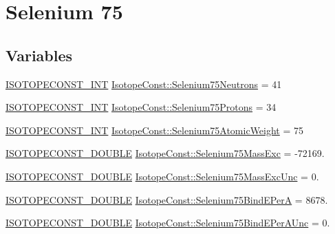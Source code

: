 \hypertarget{group___isotope_const-_selenium-_se75}{}\section{Selenium 75}
\label{group___isotope_const-_selenium-_se75}
\subsection*{Variables}
\begin{DoxyCompactItemize}
\item 
\mbox{\hyperlink{group___isotope_const-_macros_ga5f18360b3e99483a35c32d789e62621c}{I\+S\+O\+T\+O\+P\+E\+C\+O\+N\+S\+T\+\_\+\+I\+NT}} \mbox{\hyperlink{group___isotope_const-_selenium-_se75_gabc52ddd7e44299454b0eb4acbf9bd39d}{Isotope\+Const\+::\+Selenium75\+Neutrons}} = 41
\item 
\mbox{\hyperlink{group___isotope_const-_macros_ga5f18360b3e99483a35c32d789e62621c}{I\+S\+O\+T\+O\+P\+E\+C\+O\+N\+S\+T\+\_\+\+I\+NT}} \mbox{\hyperlink{group___isotope_const-_selenium-_se75_ga55e623409d807066b64cc396ce751565}{Isotope\+Const\+::\+Selenium75\+Protons}} = 34
\item 
\mbox{\hyperlink{group___isotope_const-_macros_ga5f18360b3e99483a35c32d789e62621c}{I\+S\+O\+T\+O\+P\+E\+C\+O\+N\+S\+T\+\_\+\+I\+NT}} \mbox{\hyperlink{group___isotope_const-_selenium-_se75_ga4b5f6c17071e4bca7ecf59ed4d6e69d7}{Isotope\+Const\+::\+Selenium75\+Atomic\+Weight}} = 75
\item 
\mbox{\hyperlink{group___isotope_const-_macros_ga8f45a7272ce02c0b4c65c44636ed719a}{I\+S\+O\+T\+O\+P\+E\+C\+O\+N\+S\+T\+\_\+\+D\+O\+U\+B\+LE}} \mbox{\hyperlink{group___isotope_const-_selenium-_se75_gaa159d6e68e0fd989f88696687c50a6dd}{Isotope\+Const\+::\+Selenium75\+Mass\+Exc}} = -\/72169.
\item 
\mbox{\hyperlink{group___isotope_const-_macros_ga8f45a7272ce02c0b4c65c44636ed719a}{I\+S\+O\+T\+O\+P\+E\+C\+O\+N\+S\+T\+\_\+\+D\+O\+U\+B\+LE}} \mbox{\hyperlink{group___isotope_const-_selenium-_se75_gaae5c81419c04cce0066fba6b1b0fec52}{Isotope\+Const\+::\+Selenium75\+Mass\+Exc\+Unc}} = 0.
\item 
\mbox{\hyperlink{group___isotope_const-_macros_ga8f45a7272ce02c0b4c65c44636ed719a}{I\+S\+O\+T\+O\+P\+E\+C\+O\+N\+S\+T\+\_\+\+D\+O\+U\+B\+LE}} \mbox{\hyperlink{group___isotope_const-_selenium-_se75_gac2cf40959fe4bfaf3096fbfb304eaa9b}{Isotope\+Const\+::\+Selenium75\+Bind\+E\+PerA}} = 8678.
\item 
\mbox{\hyperlink{group___isotope_const-_macros_ga8f45a7272ce02c0b4c65c44636ed719a}{I\+S\+O\+T\+O\+P\+E\+C\+O\+N\+S\+T\+\_\+\+D\+O\+U\+B\+LE}} \mbox{\hyperlink{group___isotope_const-_selenium-_se75_gab984f70e4ffd59ad4663ddb0ba586c9f}{Isotope\+Const\+::\+Selenium75\+Bind\+E\+Per\+A\+Unc}} = 0.

\end{DoxyCompactItemize}

